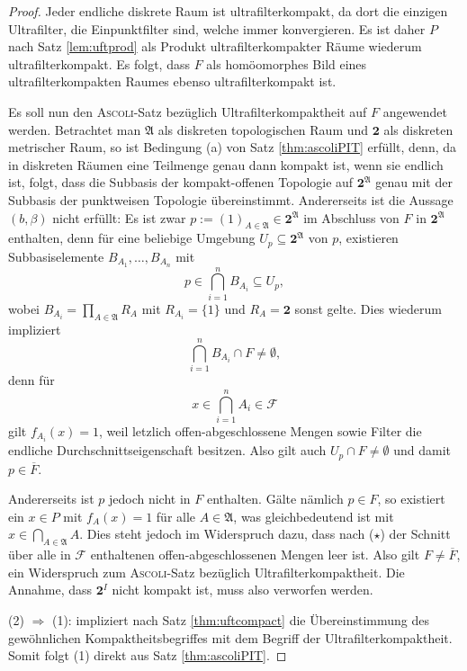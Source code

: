 \begin{proof}
  Jeder endliche diskrete Raum ist ultrafilterkompakt, da dort die einzigen Ultrafilter, die Einpunktfilter sind, welche immer konvergieren.
  Es ist daher $P$ nach Satz \ref{lem:uftprod} als Produkt ultrafilterkompakter Räume wiederum ultrafilterkompakt.
  Es folgt, dass $F$ als homöomorphes Bild eines ultrafilterkompakten Raumes ebenso ultrafilterkompakt ist.

  Es soll nun den \textsc{Ascoli}\hyp{}Satz bezüglich Ultrafilterkompaktheit auf $F$ angewendet werden.
  Betrachtet man $\mathfrak{A}$ als diskreten topologischen Raum und $\mathbf{2}$ als diskreten metrischer Raum, so ist Bedingung (a) von Satz \ref{thm:ascoliPIT} erfüllt, denn, da in diskreten Räumen eine Teilmenge genau dann kompakt ist, wenn sie endlich ist, folgt, dass die Subbasis der kompakt\hyp{}offenen Topologie auf $\mathbf{2}^\mathfrak{A}$ genau mit der Subbasis der punktweisen Topologie übereinstimmt. 
  Andererseits ist die Aussage $(b, \beta)$ nicht erfüllt:
  Es ist zwar $p := (1)_{A \in \mathfrak{A}} \in \mathbf{2}^\mathfrak{A}$ im Abschluss von $F$ in $\mathbf{2}^\mathfrak{A}$ enthalten, denn für eine beliebige Umgebung $U_p \subseteq \mathbf{2}^\mathfrak{A}$ von $p$, existieren Subbasiselemente $B_{A_1},\dots,B_{A_n}$ mit 
  \begin{displaymath}
    p \in \bigcap_{i=1}^n B_{A_i} \subseteq U_p,
  \end{displaymath}
  wobei $B_{A_i} = \prod_{A \in \mathfrak{A}} R_{A}$ mit  $R_{A_i} = \{1\}$ und $R_A = \mathbf{2}$ sonst gelte.
  Dies wiederum impliziert
  \begin{displaymath}
    \bigcap_{i=1}^n B_{A_i} \cap F \neq \emptyset,
  \end{displaymath}
  denn für 
  \begin{displaymath}
    x \in \bigcap_{i=1}^n A_i \in \mathcal{F}
  \end{displaymath}
  gilt $f_{A_i}(x) = 1$, weil letzlich offen\hyp{}abgeschlossene Mengen sowie Filter die endliche Durchschnittseigenschaft besitzen.
  Also gilt auch $U_p \cap F \neq \emptyset$ und damit $p \in \overline F$.
  
  Andererseits ist $p$ jedoch nicht in $F$ enthalten. 
  Gälte nämlich $p \in F$, so existiert ein $x \in P$ mit $f_A(x) = 1$ für alle $A \in \mathfrak{A}$, was gleichbedeutend ist mit $x \in \bigcap_{A \in \mathfrak{A}} A$.
  Dies steht jedoch im Widerspruch dazu, dass nach ($\star$) der Schnitt über alle in $\mathcal{F}$ enthaltenen offen\hyp{}abgeschlossenen Mengen leer ist.
  Also gilt $F \neq \overline{F}$, ein Widerspruch zum \textsc{Ascoli}\hyp{}Satz bezüglich Ultrafilterkompaktheit.
  Die Annahme, dass $\mathbf{2}^I$ nicht kompakt ist, muss also verworfen werden.

  (2) $\Rightarrow$ (1): \PIT impliziert nach Satz \ref{thm:uftcompact} die Übereinstimmung des gewöhnlichen Kompaktheitsbegriffes mit dem Begriff der Ultrafilterkompaktheit. Somit folgt (1) direkt aus Satz \ref{thm:ascoliPIT}.
\end{proof}


